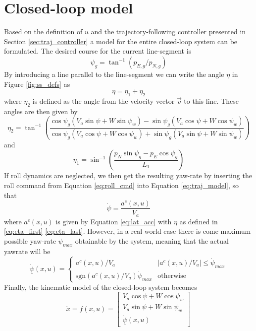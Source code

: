 \section{Closed-loop model}
Based on the definition of $u$ and the trajectory-following controller presented in Section \ref{sec:traj_controller} 
a model for the entire closed-loop system can be formulated. The desired course for the current line-segment is
\begin{equation}
    \psi_g=\tan^{-1}(p_{E,g}/p_{N,g})
\end{equation}
By introducing a line parallel to the line-segment we can write the angle $\eta$ in Figure \ref{fig:ss_defs} as
\begin{equation}\label{eq:eta_first}
    \eta=\eta_1+\eta_2
\end{equation}
where $\eta_2$ is defined as the angle from the velocity vector $\vec{v}$ to this line. These angles are then given by 
\begin{equation}
    \eta_2=\tan^{-1}\left(\frac{\cos\psi_g(V_a\sin\psi + W\sin\psi_w) - \sin\psi_g(V_a\cos\psi + W\cos\psi_w)}{\cos\psi_g(V_a\cos\psi + W\cos\psi_w)+\sin\psi_g(V_a\sin\psi + W\sin\psi_w)}\right)
\end{equation}
and 
\begin{equation}\label{eq:eta_last}
    \eta_1=\sin^{-1}\left(\frac{p_N\sin\psi_g-p_E\cos\psi_g}{L_1}\right)
\end{equation}
If roll dynamics are neglected, we then get the resulting yaw-rate by inserting the roll command from Equation \eqref{eq:roll_cmd} into Equation \eqref{eq:traj_model}, so that 
\begin{equation}
    \dot{\psi}=\frac{a^c(x, u)}{V_a}
\end{equation}
where $a^c(x, u)$ is given by Equation \eqref{eq:lat_acc} with $\eta$ as defined in \eqref{eq:eta_first}-\eqref{eq:eta_last}.
However, in a real world case there is come maximum possible yaw-rate $\dot{\psi}_{max}$ obtainable by the system, meaning that the actual yawrate will be 
\begin{equation}\label{eq:saturation}
    \underline{\dot{\psi}}(x, u)=\begin{cases}
        a^c(x, u)/V_a & |a^c(x, u)/V_a| \leq \dot{\psi}_{max} \\
        \text{sgn}(a^c(x, u)/V_a)\dot{\psi}_{max} & \text{otherwise}
    \end{cases}
\end{equation}
Finally, the kinematic model of the closed-loop system becomes
\begin{equation}\label{eq:closed_loop}
    \dot{x}=f(x,u)=
    \begin{bmatrix}
        V_a\cos\psi + W\cos\psi_w\\
        V_a\sin\psi + W\sin\psi_w\\
        \underline{\dot{\psi}}(x, u)
    \end{bmatrix}
\end{equation}

